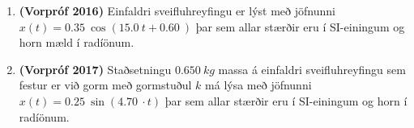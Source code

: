 \begin{enumerate}[label = \textbf{Dæmi \thechapter.\arabic*.}]

\item \textbf{(Vorpróf 2016)} Einfaldri sveifluhreyfingu er lýst með jöfnunni $x(t) = \SI{0.35}{} \cos(\SI{15.0}{} t + \SI{0.60}{})$ þar sem allar stærðir eru í SI-einingum og horn mæld í radíönum. 

\item \textbf{(Vorpróf 2017)} Staðsetningu $\SI{0.650}{kg}$ massa á einfaldri sveifluhreyfingu sem festur er við gorm með gormstuðul $k$ má lýsa með jöfnunni $x(t) = \SI{0.25}{} \sin(\SI{4.70}{}\cdot t)$ þar sem allar stærðir eru í SI-einingum og horn í radíönum. 


\end{enumerate}

